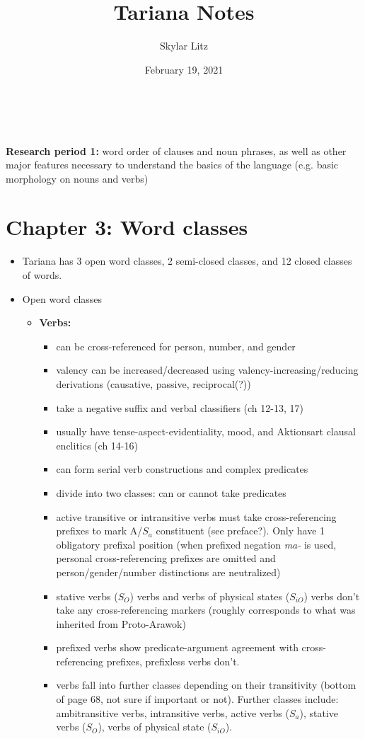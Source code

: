 \documentclass{article}
\title{Tariana Notes}
\author{Skylar Litz}
\date{February 19, 2021}
\begin{document}
\maketitle
\\ \\
\textbf{Research period 1:} word order of clauses and noun phrases, as well as other major features necessary to understand the basics of the language (e.g. basic morphology on nouns and verbs)


\section{Chapter 3: Word classes}
\begin{itemize}
	\item Tariana has 3 open word classes, 2 semi-closed classes, and 12 closed classes of words.
	\item Open word classes
	\begin{itemize}
		\item \textbf{Verbs:}
		\begin{itemize}
			\item can be cross-referenced for person, number, and gender
			\item valency can be increased/decreased using valency-increasing/reducing derivations (causative, passive, reciprocal(?))
			\item take a negative suffix and verbal classifiers (ch 12-13, 17)
			\item usually have tense-aspect-evidentiality, mood, and Aktionsart clausal enclitics (ch 14-16)
			\item can form serial verb constructions and complex predicates
			\item divide into two classes: can or cannot take predicates
			\item active transitive or intransitive verbs must take cross-referencing prefixes to mark A/$S_a$ constituent (see preface?). Only have 1 obligatory prefixal position (when prefixed negation \emph{ma-} is used, personal cross-referencing prefixes are omitted and person/gender/number distinctions are neutralized)
			\item stative verbs ($S_O$) verbs and verbs of physical states ($S_{iO}$) verbs don't take any cross-referencing markers (roughly corresponds to what was inherited from Proto-Arawok)
			\item prefixed verbs show predicate-argument agreement with cross-referencing prefixes, prefixless verbs don't.
			\item verbs fall into further classes depending on their transitivity (bottom of page 68, not sure if important or not). Further classes include: ambitransitive verbs, intransitive verbs, active verbs ($S_a$), stative verbs ($S_O$), verbs of physical state ($S_{iO}$).
		\end{itemize}


\end{itemize}
\end{itemize}
\end{document}
